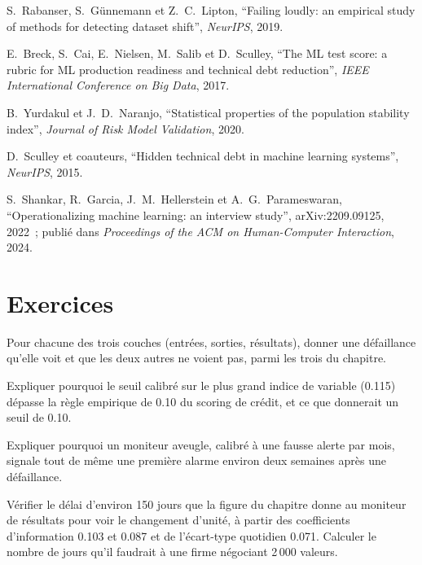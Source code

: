 \begin{omsources}
\item S.~Rabanser, S.~Günnemann et Z.~C.~Lipton, ``Failing loudly: an empirical study of methods for detecting dataset
shift'', \emph{NeurIPS}, 2019.
\item E.~Breck, S.~Cai, E.~Nielsen, M.~Salib et D.~Sculley, ``The ML test score: a rubric for ML production readiness and
technical debt reduction'', \emph{IEEE International Conference on Big Data}, 2017.
\item B.~Yurdakul et J.~D.~Naranjo, ``Statistical properties of the population stability index'', \emph{Journal of Risk Model
Validation}, 2020.
\item D.~Sculley et coauteurs, ``Hidden technical debt in machine learning systems'', \emph{NeurIPS}, 2015.
\item S.~Shankar, R.~Garcia, J.~M.~Hellerstein et A.~G.~Parameswaran, ``Operationalizing machine learning: an interview
study'', arXiv:2209.09125, 2022~; publié dans \emph{Proceedings of the ACM on Human-Computer Interaction}, 2024.
\end{omsources}

\section{Exercices}

\begin{exercise}[$\star$]\label{exo:ml:monitoring-and-retraining:1}
Pour chacune des trois couches (entrées, sorties, résultats), donner une défaillance qu'elle voit et que les deux autres ne voient pas, parmi
les trois du chapitre.
\end{exercise}

\begin{exercise}[$\star$]\label{exo:ml:monitoring-and-retraining:2}
Expliquer pourquoi le seuil calibré sur le plus grand indice de variable (0.115) dépasse la règle empirique de 0.10 du scoring
de crédit, et ce que donnerait un seuil de 0.10.
\end{exercise}

\begin{exercise}[$\star$]\label{exo:ml:monitoring-and-retraining:3}
Expliquer pourquoi un moniteur aveugle, calibré à une fausse alerte par mois, signale tout de même une première alarme environ deux semaines après une défaillance.
\end{exercise}

\begin{exercise}[$\star\star$]\label{exo:ml:monitoring-and-retraining:4}
Vérifier le délai d'environ 150 jours que la figure du chapitre donne au moniteur de résultats pour voir le changement d'unité, à partir des coefficients d'information
0.103 et 0.087 et de l'écart-type quotidien 0.071. Calculer le nombre de jours qu'il faudrait à une firme négociant 2\,000 valeurs.
\end{exercise}

